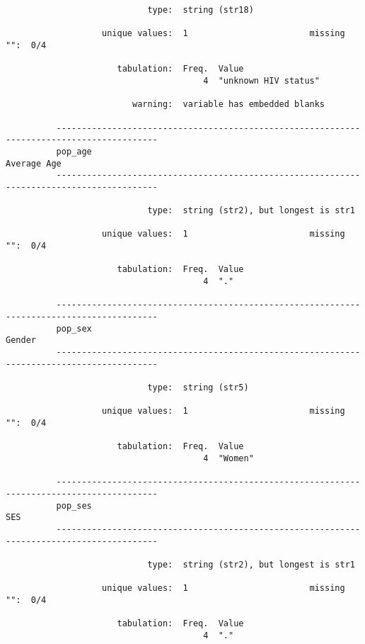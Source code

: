 \documentclass{article}
\begin{document}
\begin{verbatim}
                            type:  string (str18)
          
                   unique values:  1                        missing "":  0/4
          
                      tabulation:  Freq.  Value
                                       4  "unknown HIV status"
          
                         warning:  variable has embedded blanks
          
          ------------------------------------------------------------------------------------------
          pop_age                                                                        Average Age
          ------------------------------------------------------------------------------------------
          
                            type:  string (str2), but longest is str1
          
                   unique values:  1                        missing "":  0/4
          
                      tabulation:  Freq.  Value
                                       4  "."
          
          ------------------------------------------------------------------------------------------
          pop_sex                                                                             Gender
          ------------------------------------------------------------------------------------------
          
                            type:  string (str5)
          
                   unique values:  1                        missing "":  0/4
          
                      tabulation:  Freq.  Value
                                       4  "Women"
          
          ------------------------------------------------------------------------------------------
          pop_ses                                                                                SES
          ------------------------------------------------------------------------------------------
          
                            type:  string (str2), but longest is str1
          
                   unique values:  1                        missing "":  0/4
          
                      tabulation:  Freq.  Value
                                       4  "."
          

\end{verbatim}
\end{document}
